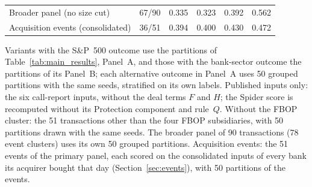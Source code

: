 \begin{table}[!t]
\begin{tabular*}{\textwidth}{@{\extracolsep{\fill}}lccccc}
\midrule
Broader panel (no size cut) & 67/90 & 0.335 & 0.323 & 0.392 & 0.562 \\
Acquisition events (consolidated) & 36/51 & 0.394 & 0.400 & 0.430 & 0.472 \\
\bottomrule
\end{tabular*}
\par\vspace{2pt}\parbox{0.96\textwidth}{\scriptsize Variants with the S\&P~500 outcome use the partitions of Table~\ref{tab:main_results},
Panel~A, and those with the bank-sector outcome the partitions of its Panel~B; each alternative outcome in Panel~A uses 50
grouped partitions with the same seeds, stratified on its own labels. Published inputs only: the six call-report inputs, without
the deal terms $F$ and $H$; the Spider score is recomputed without its Protection component and rule~$Q$. Without the FBOP cluster:
the 51 transactions other than the four FBOP subsidiaries, with 50 partitions drawn with the same seeds. The broader panel of 90
transactions (78 event clusters) uses its own 50 grouped partitions. Acquisition events: the 51 events of the primary panel, each
scored on the consolidated inputs of every bank its acquirer bought that day (Section~\ref{sec:events}), with 50 partitions of the
events.}
\end{table}
